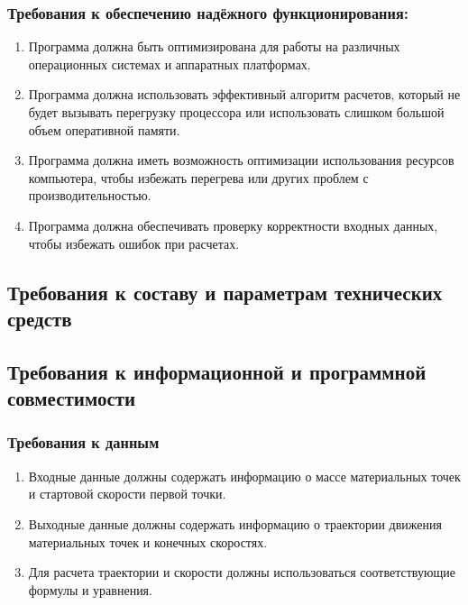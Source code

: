  \subsubsection{Требования к обеспечению надёжного функционирования:}
 \begin{enumerate}
  \item Программа должна быть оптимизирована для работы на различных операционных системах и аппаратных платформах.
  \item Программа должна использовать эффективный алгоритм расчетов, который не будет вызывать перегрузку процессора или использовать слишком большой объем оперативной памяти.
  \item Программа должна иметь возможность оптимизации использования ресурсов компьютера, чтобы избежать перегрева или других проблем с производительностью.
  \item Программа должна обеспечивать проверку корректности входных данных, чтобы избежать ошибок при расчетах.
 \end{enumerate}


 \subsection{Требования к составу и параметрам технических средств}

 \subsection{Требования к информационной и программной совместимости}
 \subsubsection{Требования к данным}
 \begin{enumerate}
  \item Входные данные должны содержать информацию о массе материальных точек и стартовой скорости первой точки.
  \item Выходные данные должны содержать информацию о траектории движения материальных точек и конечных скоростях.
  \item Для расчета траектории и скорости должны использоваться соответствующие формулы и уравнения.
 \end{enumerate}

